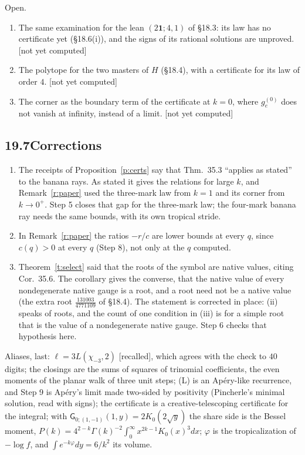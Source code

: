 \documentclass[11pt]{article}
\newcommand{\one}{\mathbf 1}
\newcommand{\sG}{\mathsf G}
\theoremstyle{plain}
\theoremstyle{definition}
\theoremstyle{remark}
\newcommand{\recalled}{\textup{[recalled]}}
\newcommand{\notyet}{\textup{[not yet computed]}}
\begin{document}
\noindent Open.
\begin{enumerate}[label=(\roman*)]
\item The same examination for the lean $(2\one;4,1)$ of \S18.3: its law has no certificate yet (\S18.6(i)), and the signs of its rational solutions are unproved. \notyet
\item The polytope for the two masters of $H$ (\S18.4), with a certificate for its law of order $4$. \notyet
\item The corner as the boundary term of the certificate at $k=0$, where $g^{(0)}_e$ does not vanish at infinity, instead of a limit. \notyet
\end{enumerate}

\subsection*{19.7\quad Corrections}

\begin{enumerate}[label=(\roman*)]
\item The receipts of Proposition~\ref{p:certs} say that Thm.~35.3 ``applies as stated'' to the banana rays. As stated it gives the relations for large $k$, and Remark~\ref{r:paper} used the three-mark law from $k=1$ and its corner from $k\to0^+$. Step 5 closes that gap for the three-mark law; the four-mark banana ray needs the same bounds, with its own tropical stride.
\item In Remark~\ref{r:paper} the ratios $-r/c$ are lower bounds at every $q$, since $c(q)>0$ at every $q$ (Step 8), not only at the $q$ computed.
\item Theorem~\ref{t:select} said that the roots of the symbol are native values, citing Cor.~35.6. The corollary gives the converse, that the native value of every nondegenerate native gauge is a root, and a root need not be a native value (the extra root $\frac{131003}{4771109}$ of \S18.4). The statement is corrected in place: (ii) speaks of roots, and the count of one condition in (iii) is for a simple root that is the value of a nondegenerate native gauge. Step 6 checks that hypothesis here.
\end{enumerate}

\noindent Aliases, last: $\ell=3L(\chi_{-3},2)$ \recalled, which agrees with the check to $40$ digits; the closings are the sums of squares of trinomial coefficients, the even moments of the planar walk of three unit steps; (L) is an Ap\'ery-like recurrence, and Step 9 is Ap\'ery's limit made two-sided by positivity (Pincherle's minimal solution, read with signs); the certificate is a creative-telescoping certificate for the integral; with $\sG_{0;(1,-1)}(1,y)=2K_0(2\sqrt y)$ the share side is the Bessel moment, $P(k)=4^{2-k}\Gamma(k)^{-2}\int_0^\infty x^{2k-1}K_0(x)^3dx$; $\varphi$ is the tropicalization of $-\log f$, and $\int e^{-k\varphi}dy=6/k^2$ its volume.
\end{document}
